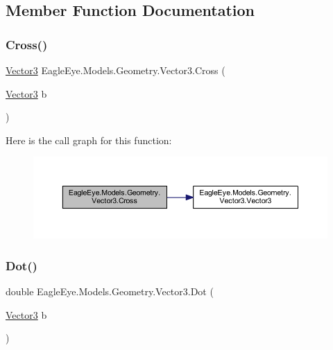\subsection{Member Function Documentation}
\mbox{\label{struct_eagle_eye_1_1_models_1_1_geometry_1_1_vector3_ad6e110290dd96cccb44c11a18293f68e}} 
\subsubsection{\texorpdfstring{Cross()}{Cross()}}
{\footnotesize\ttfamily \mbox{\hyperlink{struct_eagle_eye_1_1_models_1_1_geometry_1_1_vector3}{Vector3}} Eagle\+Eye.\+Models.\+Geometry.\+Vector3.\+Cross (\begin{DoxyParamCaption}\item[{\mbox{\hyperlink{struct_eagle_eye_1_1_models_1_1_geometry_1_1_vector3}{Vector3}}}]{b }\end{DoxyParamCaption})}

Here is the call graph for this function\+:\nopagebreak
\begin{figure}[H]
\begin{center}
\leavevmode
\includegraphics[width=350pt]{struct_eagle_eye_1_1_models_1_1_geometry_1_1_vector3_ad6e110290dd96cccb44c11a18293f68e_cgraph}
\end{center}
\end{figure}
\mbox{\label{struct_eagle_eye_1_1_models_1_1_geometry_1_1_vector3_a49b888e998b726bb81dd37f41321b05b}} 
\subsubsection{\texorpdfstring{Dot()}{Dot()}}
{\footnotesize\ttfamily double Eagle\+Eye.\+Models.\+Geometry.\+Vector3.\+Dot (\begin{DoxyParamCaption}\item[{\mbox{\hyperlink{struct_eagle_eye_1_1_models_1_1_geometry_1_1_vector3}{Vector3}}}]{b }\end{DoxyParamCaption})}

